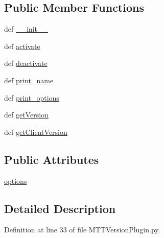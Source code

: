 \subsection*{Public Member Functions}
\begin{DoxyCompactItemize}
\item 
def \hyperlink{classMTTVersionPlugin_1_1MTTVersionPlugin_ac0154c5878b4d9428f25bd81041a7001}{\-\_\-\-\_\-init\-\_\-\-\_\-}
\item 
def \hyperlink{classMTTVersionPlugin_1_1MTTVersionPlugin_a226b355e9ac12c9ff72acdb0caed743f}{activate}
\item 
def \hyperlink{classMTTVersionPlugin_1_1MTTVersionPlugin_a8b2f6a214a6b2aa86edb153ef202cae2}{deactivate}
\item 
def \hyperlink{classMTTVersionPlugin_1_1MTTVersionPlugin_a99e7df2f04fea79f772d940de9bb734e}{print\-\_\-name}
\item 
def \hyperlink{classMTTVersionPlugin_1_1MTTVersionPlugin_af46b74be44c27d532b1d542c8fafef8e}{print\-\_\-options}
\item 
def \hyperlink{classMTTVersionPlugin_1_1MTTVersionPlugin_ad1be874bcc65f8cf6262403e414ce8e8}{get\-Version}
\item 
def \hyperlink{classMTTVersionPlugin_1_1MTTVersionPlugin_a8352904d6605d8c47b3c98b92a304ec7}{get\-Client\-Version}
\end{DoxyCompactItemize}
\subsection*{Public Attributes}
\begin{DoxyCompactItemize}
\item 
\hyperlink{classMTTVersionPlugin_1_1MTTVersionPlugin_a95c4231c332e3aa0af05703aa9858c8c}{options}
\end{DoxyCompactItemize}


\subsection{Detailed Description}


Definition at line 33 of file M\-T\-T\-Version\-Plugin.\-py.



